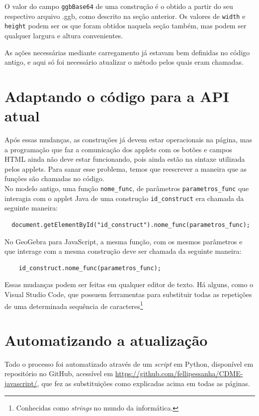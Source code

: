 O valor do campo \texttt{ggbBase64} de uma construção é o obtido a partir do seu respectivo arquivo .ggb, como descrito na seção anterior. Os valores de \texttt{width} e \texttt{height} podem ser os que foram obtidos naquela seção também, mas podem ser qualquer largura e altura convenientes.

As ações necessárias mediante carregamento já estavam bem definidas no código antigo, e aqui só foi necessário atualizar o método pelos quais eram chamadas.

\section{Adaptando o código para a API atual}

Após essas mudanças, as construções já devem estar operacionais na página, mas a programação que faz a comunicação dos applets com os botões e campos HTML ainda não deve estar funcionando, pois ainda estão na sintaxe utilizada pelos applets. Para sanar esse problema, temos que reescrever a maneira que as funções são chamadas no código.
\\

No modelo antigo, uma função \texttt{nome\_func}, de parâmetros \texttt{parametros\_func}  que interagia com o applet Java de uma construção \texttt{id\_construct} era chamada da seguinte maneira:

\begin{verbatim}
  document.getElementById("id_construct").nome_func(parametros_func);
\end{verbatim}

No GeoGebra para JavaScript, a mesma função, com os mesmos parâmetros e que interage com a mesma construção deve ser chamada da seguinte maneira:

\begin{verbatim}
    id_construct.nome_func(parametros_func);
\end{verbatim}

Essas mudanças podem ser feitas em qualquer editor de texto. Há alguns, como o Visual Studio Code, que possuem ferramentas para substituir todas as repetições de uma determinada sequência de caracteres\footnote{Conhecidas como \textit{strings} no mundo da informática.}

\section{Automatizando a atualização}

Todo o processo foi automatizado através de um \textit{script} em Python, disponível em repositório no GitHub, acessível em \url{https://github.com/fellipessanha/CDME-javascript/}, que fez as substituições como explicadas acima em todas as páginas.

